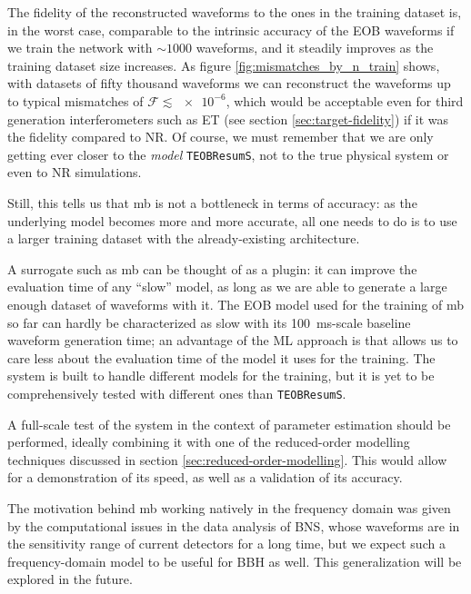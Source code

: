 \documentclass[main.tex]{subfiles}
\begin{document}
The fidelity of the reconstructed waveforms to the ones in the training dataset is, in the worst case, comparable to the intrinsic accuracy of the \ac{EOB} waveforms if we train the network with \(\sim 1000\) waveforms, and it steadily improves as the training dataset size increases.
As figure \ref{fig:mismatches_by_n_train} shows, with datasets of fifty thousand waveforms we can reconstruct the waveforms up to typical mismatches of \(\mathcal{F} \lesssim \num{e-6}\), which would be acceptable even for third generation interferometers such as \ac{ET} (see section \ref{sec:target-fidelity}) if it was the fidelity compared to \ac{NR}.
Of course, we must remember that we are only getting ever closer to the \emph{model} \texttt{TEOBResumS}, not to the true physical system or even to \ac{NR} simulations.

Still, this tells us that \ac{mb} is not a bottleneck in terms of accuracy: as the underlying model becomes more and more accurate, all one needs to do is to use a larger training dataset with the already-existing architecture.


A surrogate such as \ac{mb} can be thought of as a plugin: it can improve the evaluation time of any ``slow'' model, as long as we are able to generate a large enough dataset of waveforms with it. 
The \ac{EOB} model used for the training of \ac{mb} so far can hardly be characterized as slow with its \SI{100}{ms}-scale baseline waveform generation time; an advantage of the \ac{ML} approach is that allows us to care less about the evaluation time of the model it uses for the training. 
The system is built to handle different models for the training, but it is yet to be comprehensively tested with different ones than \texttt{TEOBResumS}.

A full-scale test of the system in the context of parameter estimation should be performed, ideally combining it with one of the reduced-order modelling techniques discussed in section \ref{sec:reduced-order-modelling}.
This would allow for a demonstration of its speed, as well as a validation of its accuracy.

The motivation behind \ac{mb} working natively in the frequency domain was given by the computational issues in the data analysis of \ac{BNS}, whose waveforms are in the sensitivity range of current detectors for a long time, but we expect such a frequency-domain model to be useful for \ac{BBH} as well. This generalization will be explored in the future.
\end{document}
